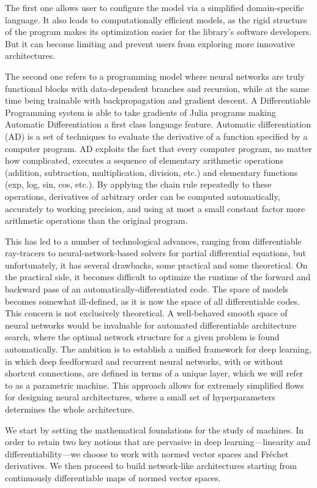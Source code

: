 \documentclass{article}
\begin{document}
The first one allows user to configure the
model via a simplified domain-specific language. It also leads to computationally efficient models, as the rigid structure of the program makes its optimization easier for the library’s software developers.
But it can  become limiting and prevent users from exploring more innovative architectures.

The second one refers to a programming model where
neural networks are truly functional blocks with data-dependent branches and recursion, while at the same time being trainable with backpropagation and gradient descent.
A Differentiable Programming system  is able to take gradients of Julia programs making Automatic Differentiation a first class language
feature.
 Automatic differentiation (AD) is a set of techniques to evaluate the derivative of a function specified by a computer program. AD exploits the fact that every computer program, no matter how complicated, executes a sequence of elementary arithmetic operations (addition, subtraction, multiplication, division, etc.) and elementary functions (exp, log, sin, cos, etc.). By applying the chain rule repeatedly to these operations, derivatives of arbitrary order can be computed automatically, accurately to working precision, and using at most a small constant factor more arithmetic operations than the original program.


This has led to a number of technological advances, ranging from differentiable ray-tracers to neural-network-based solvers for partial differential equations, but unfortunately, it has several drawbacks, some practical and some theoretical. On the practical side, it becomes difficult to optimize the runtime of
the forward and backward pass of an automatically-differentiated code.
The space of models becomes somewhat ill-defined, as it is now the space of all differentiable codes. This concern is not exclusively
theoretical. A well-behaved smooth space of neural networks would
be invaluable for automated differentiable architecture search, where the
optimal network structure for a given problem is found automatically. 
The ambition is to establish a unified framework for deep learning, in
which deep feedforward and recurrent neural networks, with or without shortcut connections, are defined in terms of a unique layer, which we will refer to as a parametric machine. This approach allows for extremely simplified flows for designing neural architectures, where a small set of hyperparameters determines the whole architecture.

\noindent
We start by setting the mathematical foundations for the study of machines.
In order to retain two key notions that are pervasive in deep learning—linearity
and differentiability—we choose to work with normed vector spaces and Fréchet derivatives. We then proceed to build network-like architectures starting from continuously differentiable maps of normed vector spaces.
\end{document}
